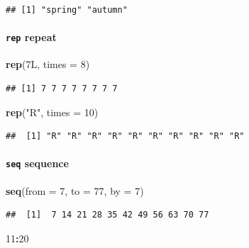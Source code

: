 \documentclass[
]{book}
\newenvironment{Shaded}{\begin{snugshade}}{\end{snugshade}}
\newcommand{\AttributeTok}[1]{\textcolor[rgb]{0.13,0.29,0.53}{#1}}
\newcommand{\DecValTok}[1]{\textcolor[rgb]{0.00,0.00,0.81}{#1}}
\newcommand{\FunctionTok}[1]{\textcolor[rgb]{0.13,0.29,0.53}{\textbf{#1}}}
\newcommand{\NormalTok}[1]{#1}
\newcommand{\SpecialCharTok}[1]{\textcolor[rgb]{0.81,0.36,0.00}{\textbf{#1}}}
\newcommand{\StringTok}[1]{\textcolor[rgb]{0.31,0.60,0.02}{#1}}
\theoremstyle{definition}
\theoremstyle{definition}
\theoremstyle{definition}
\theoremstyle{definition}
\theoremstyle{remark}
\begin{document}
\begin{verbatim}
## [1] "spring" "autumn"
\end{verbatim}

\hypertarget{rep-repeat}{%
\paragraph{\texorpdfstring{\texttt{rep} repeat}{rep repeat}}\label{rep-repeat}}

\begin{Shaded}
\begin{Highlighting}[]
\FunctionTok{rep}\NormalTok{(7L, }\AttributeTok{times =} \DecValTok{8}\NormalTok{)}
\end{Highlighting}
\end{Shaded}

\begin{verbatim}
## [1] 7 7 7 7 7 7 7 7
\end{verbatim}

\begin{Shaded}
\begin{Highlighting}[]
\FunctionTok{rep}\NormalTok{(}\StringTok{"R"}\NormalTok{, }\AttributeTok{times =} \DecValTok{10}\NormalTok{)}
\end{Highlighting}
\end{Shaded}

\begin{verbatim}
##  [1] "R" "R" "R" "R" "R" "R" "R" "R" "R" "R"
\end{verbatim}

\hypertarget{seq-sequence}{%
\paragraph{\texorpdfstring{\texttt{seq} sequence}{seq sequence}}\label{seq-sequence}}

\begin{Shaded}
\begin{Highlighting}[]
\FunctionTok{seq}\NormalTok{(}\AttributeTok{from =} \DecValTok{7}\NormalTok{, }\AttributeTok{to =} \DecValTok{77}\NormalTok{, }\AttributeTok{by =} \DecValTok{7}\NormalTok{)}
\end{Highlighting}
\end{Shaded}

\begin{verbatim}
##  [1]  7 14 21 28 35 42 49 56 63 70 77
\end{verbatim}

\begin{Shaded}
\begin{Highlighting}[]
\DecValTok{11}\SpecialCharTok{:}\DecValTok{20}
\end{Highlighting}
\end{Shaded}
\end{document}
